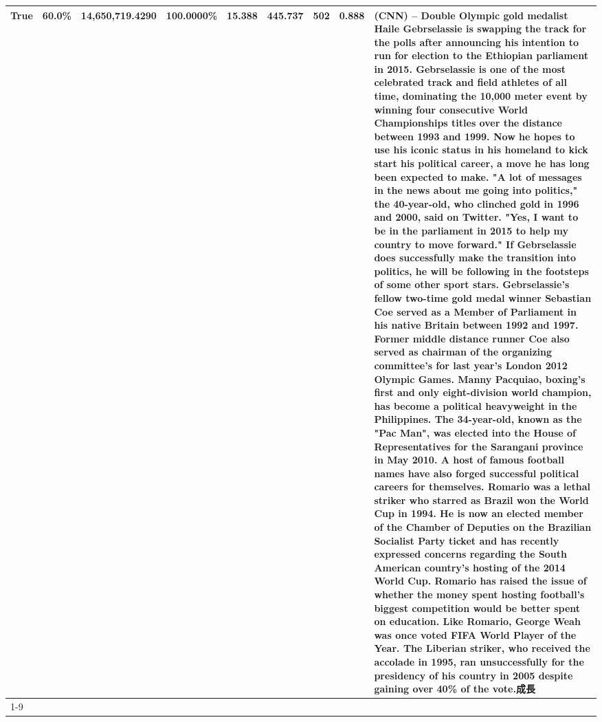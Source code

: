 \begin{table}[H]
{\begin{tabular}{lllrlllll}
True & 60.0\% & 14,650,719.4290 & \bfseries \color{red} 100.0000\% & 15.388 & 445.737 & 502 & 0.888 & (CNN) -- Double Olympic gold medalist Haile Gebrselassie is swapping the track for the polls after announcing his intention to run for election to the Ethiopian parliament in 2015. Gebrselassie is one of the most celebrated track and field athletes of all time, dominating the 10,000 meter event by winning four consecutive World Championships titles over the distance between 1993 and 1999. Now he hopes to use his iconic status in his homeland to kick start his political career, a move he has long been expected to make. "A lot of messages in the news about me going into politics," the 40-year-old, who clinched gold in 1996 and 2000, said on Twitter. "Yes, I want to be in the parliament in 2015 to help my country to move forward." If Gebrselassie does successfully make the transition into politics, he will be following in the footsteps of some other sport stars. Gebrselassie's fellow two-time gold medal winner Sebastian Coe served as a Member of Parliament in his native Britain between 1992 and 1997. Former middle distance runner Coe also served as chairman of the organizing committee's for last year's London 2012 Olympic Games. Manny Pacquiao, boxing's first and only eight-division world champion, has become a political heavyweight in the Philippines. The 34-year-old, known as the "Pac Man", was elected into the House of Representatives for the Sarangani province in May 2010. A host of famous football names have also forged successful political careers for themselves. Romario was a lethal striker who starred as Brazil won the World Cup in 1994. He is now an elected member of the Chamber of Deputies on the Brazilian Socialist Party ticket and has recently expressed concerns regarding the South American country's hosting of the 2014 World Cup. Romario has raised the issue of whether the money spent hosting football's biggest competition would be better spent on education. Like Romario, George Weah was once voted FIFA World Player of the Year. The Liberian striker, who received the accolade in 1995, ran unsuccessfully for the presidency of his country in 2005 despite gaining over 40\% of the vote.成長 \\
\cline{1-9}

\end{tabular}}
\end{table}
